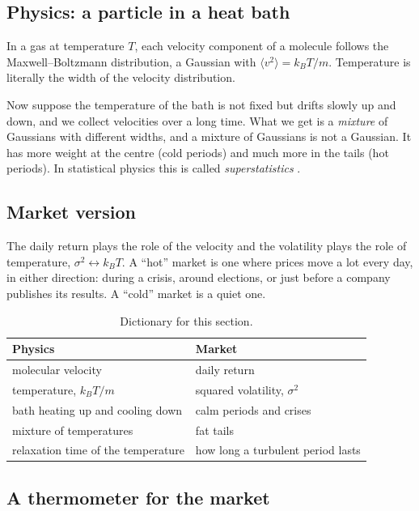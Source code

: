 \documentclass[11pt,a4paper]{article}
\begin{document}
\subsection{Physics: a particle in a heat bath}

In a gas at temperature $T$, each velocity component of a molecule follows the Maxwell--Boltzmann
distribution, a Gaussian with $\langle v^2\rangle=k_BT/m$. Temperature is literally the width of the
velocity distribution.

Now suppose the temperature of the bath is not fixed but drifts slowly up and down, and we collect
velocities over a long time. What we get is a \emph{mixture} of Gaussians with different widths, and a
mixture of Gaussians is not a Gaussian. It has more weight at the centre (cold periods) and much more in
the tails (hot periods). In statistical physics this is called \emph{superstatistics} \cite{beck2003}.

\subsection{Market version}

The daily return plays the role of the velocity and the volatility plays the role of temperature,
$\sigma^2\leftrightarrow k_BT$. A ``hot'' market is one where prices move a lot every day, in either
direction: during a crisis, around elections, or just before a company publishes its results. A ``cold''
market is a quiet one.

\begin{table}[ht]
\centering\small
\caption{Dictionary for this section.}
\begin{tabular}{@{}ll@{}}
\toprule
Physics & Market \\
\midrule
molecular velocity & daily return\\
temperature, $k_BT/m$ & squared volatility, $\sigma^2$\\
bath heating up and cooling down & calm periods and crises\\
mixture of temperatures & fat tails\\
relaxation time of the temperature & how long a turbulent period lasts\\
\bottomrule
\end{tabular}
\end{table}

\subsection{A thermometer for the market}
\end{document}
